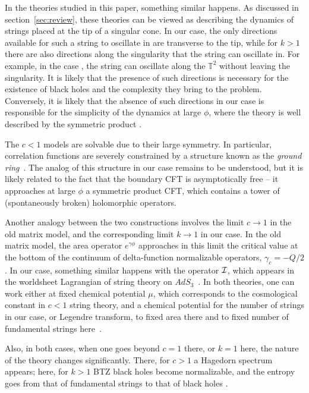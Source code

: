 \documentclass[12pt]{article}
\newcommand{\bT}{{\mathbb T}}
\numberwithin{equation}{section}
\begin{document}
In the theories studied in this paper, something similar happens. As discussed in section~\ref{sec:review}, these theories can be viewed as describing the dynamics of strings placed at the tip of a singular cone. In our case, the only directions available for such a string to oscillate in are transverse to the tip, while for $k>1$ there are also directions along the singularity that the string can oscillate in. For example, in the case \ardougads, the string can oscillate along the $\bT^2$ without leaving the singularity. It is likely that the presence of such directions is necessary for the existence of black holes and the complexity they bring to the problem. Conversely, it is likely that the absence of such directions in our case is responsible for the simplicity of the dynamics at large $\phi$, where the theory is well described by the symmetric product \ourcft.

The $c<1$ models are solvable due to their large symmetry. In particular, correlation functions are severely constrained by a structure known as the {\it ground ring}~. The analog of this structure in our case remains to be understood, but it is likely related to the fact that the boundary CFT is asymptotically free -- it approaches at large $\phi$ a symmetric product CFT, which contains a tower of (spontaneously broken) holomorphic operators.   

Another analogy between the two constructions involves the limit $c\to 1$ in the old matrix model, and the corresponding limit $k\to 1$ in our case. In the old matrix model, the area operator $e^{\gamma\phi}$ approaches in this limit the critical value at the bottom of the continuum of delta-function normalizable operators, $\gamma_c= -Q/2$. In our case, something similar happens with the operator $\mathcal {I}$, which appears in the worldsheet Lagrangian of string theory on $AdS_3$~.  In both theories, one can work either at fixed chemical potential $\mu$, which corresponds to the cosmological constant in $c<1$ string theory, and a chemical potential for the number of strings in our case, or Legendre transform, to fixed area there and to fixed number of fundamental strings here~. 

Also, in both cases, when one goes beyond $c=1$ there, or $k=1$ here, the nature of the theory changes significantly.  There, for $c>1$ a Hagedorn spectrum appears; here, for $k>1$ BTZ black holes become normalizable, and the entropy goes from that of fundamental strings to that of black holes .
\end{document}

